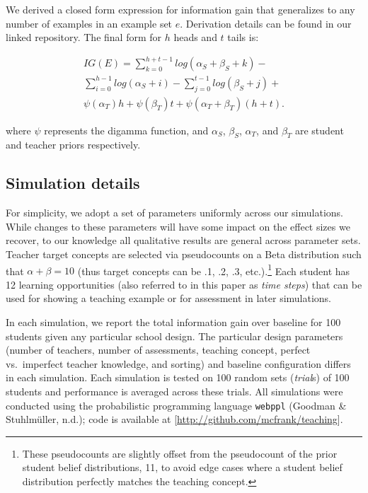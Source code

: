 \documentclass[man]{apa6}
\begin{document}
We derived a closed form expression for information gain that
generalizes to any number of examples in an example set \(e\).
Derivation details can be found in our linked repository. The final form
for \(h\) heads and \(t\) tails is:

\begin{multline}
IG(E) = \sum_{k=0}^{h+t-1} {log(\alpha_S + \beta_S + k)} - \\
\sum_{i=0}^{h-1} {log (\alpha_S + i)} - \sum_{j=0}^{t-1} {log(\beta_S +j)} + \\
\psi(\alpha_T)h + \psi(\beta_T)t +  \psi(\alpha_T + \beta_T)(h+t).
\end{multline}

\noindent where \(\psi\) represents the digamma function, and
\(\alpha_S\), \(\beta_S\), \(\alpha_T\), and \(\beta_T\) are student and
teacher priors respectively.

\subsection{Simulation details}\label{simulation-details}

For simplicity, we adopt a set of parameters uniformly across our
simulations. While changes to these parameters will have some impact on
the effect sizes we recover, to our knowledge all qualitative results
are general across parameter sets. Teacher target concepts are selected
via pseudocounts on a Beta distribution such that
\(\alpha + \beta = 10\) (thus target concepts can be .1, .2, .3,
etc.).\footnote{These pseudocounts are slightly offset from the pseudocount of the prior student belief distributions, 11, to avoid edge cases where a student belief distribution perfectly matches the teaching concept.}
Each student has 12 learning opportunities (also referred to in this
paper as \emph{time steps}) that can be used for showing a teaching
example or for assessment in later simulations.

In each simulation, we report the total information gain over baseline
for 100 students given any particular school design. The particular
design parameters (number of teachers, number of assessments, teaching
concept, perfect vs.~imperfect teacher knowledge, and sorting) and
baseline configuration differs in each simulation. Each simulation is
tested on 100 random sets (\emph{trial}s) of 100 students and
performance is averaged across these trials. All simulations were
conducted using the probabilistic programming language \texttt{webppl}
(Goodman \& Stuhlmüller, n.d.); code is available at
{[}\url{http://github.com/mcfrank/teaching}{]}.
\end{document}
